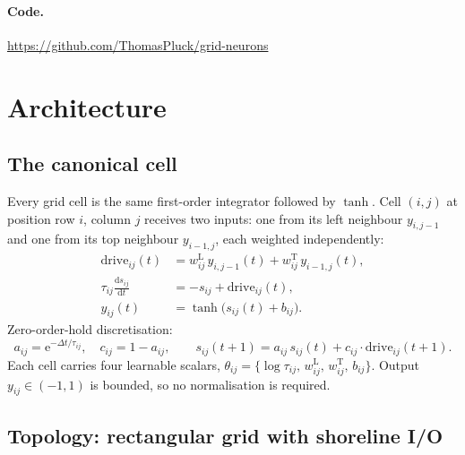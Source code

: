 \documentclass[11pt]{article}
\begin{document}
\paragraph{Code.} \url{https://github.com/ThomasPluck/grid-neurons}

\section{Architecture}
\label{sec:arch}

\subsection{The canonical cell}

Every grid cell is the same first-order integrator followed by $\tanh$.
Cell $(i, j)$ at position row $i$, column $j$ receives two inputs:
one from its left neighbour $y_{i, j-1}$ and one from its top neighbour
$y_{i-1, j}$, each weighted independently:
\begin{align}
\mathrm{drive}_{ij}(t) &= w_{ij}^{\text{L}}\, y_{i,j-1}(t) + w_{ij}^{\text{T}}\, y_{i-1,j}(t), \\
\tau_{ij} \frac{\mathrm{d}s_{ij}}{\mathrm{d}t} &= -s_{ij} + \mathrm{drive}_{ij}(t), \\
y_{ij}(t) &= \tanh\!\big(s_{ij}(t) + b_{ij}\big).
\end{align}
Zero-order-hold discretisation:
\begin{equation}
a_{ij} = \mathrm{e}^{-\Delta t/\tau_{ij}}, \quad c_{ij} = 1 - a_{ij},\qquad
s_{ij}(t{+}1) = a_{ij}\, s_{ij}(t) + c_{ij} \cdot \mathrm{drive}_{ij}(t{+}1).
\label{eq:discrete}
\end{equation}
Each cell carries four learnable scalars,
$\theta_{ij} = \{\log \tau_{ij},\, w_{ij}^{\text{L}},\, w_{ij}^{\text{T}},\, b_{ij}\}$.
Output $y_{ij} \in (-1, 1)$ is bounded, so no normalisation is required.

\subsection{Topology: rectangular grid with shoreline I/O}
\end{document}
